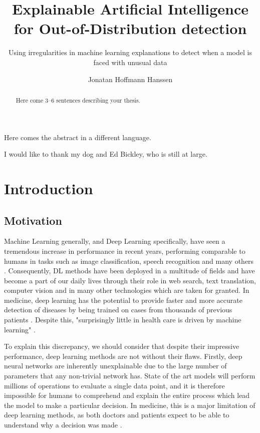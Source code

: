 \documentclass[UKenglish]{uiomasterthesis} %
\title{Explainable Artificial Intelligence for Out-of-Distribution detection}
\subtitle{Using irregularities in machine learning explanations to detect when a model is faced with unusual data}
\author{Jonatan Hoffmann Hanssen}
\theoremstyle{definition}
\begin{document}
\uiomasterfp[dept={Department of Informatics},
program={Robotics and Intelligent Systems},
supervisors={Hugo Lewi Hammer \and Kyrre Harald Glette},
long]

\frontmatter{}
\begin{abstract}
Here come 3--6 sentences describing your thesis.
\end{abstract}

\begin{xabstract}[Sammendrag]
Here comes the abstract in a different language.
\end{xabstract}

\tableofcontents{}
\listoffigures{}
\listoftables{}

\begin{preface}
I would like to thank my dog and Ed Bickley, who is still at large.
\end{preface}

\mainmatter{}
\chapter{Introduction}

\section{Motivation}

Machine Learning generally, and Deep Learning specifically, have seen a tremendous increase in performance in recent years, performing comparable to humans in tasks such as image classification, speech recognition and many others \cite{performance}. Consequently, DL methods have been deployed in a multitude of fields and have become a part of our daily lives through their role in web search, text translation, computer vision and in many other technologies which are taken for granted. In medicine, deep learning has the potential to provide faster and more accurate detection of diseases by being trained on cases from thousands of previous patients \cite{xaisurvey}. Despite this, "surprisingly little in health care is driven by machine learning" \cite{dlmed}.


To explain this discrepancy, we should consider that despite their impressive performance, deep learning methods are not without their flaws. Firstly, deep neural networks are inherently unexplainable due to the large number of parameters that any non-trivial network has. State of the art models will perform millions of operations to evaluate a single data point, and it is therefore impossible for humans to comprehend and explain the entire process which lead the model to make a particular decision. In medicine, this is a major limitation of deep learning methods, as both doctors and patients expect to be able to understand why a decision was made \cite{tingsim}.
\end{document}
